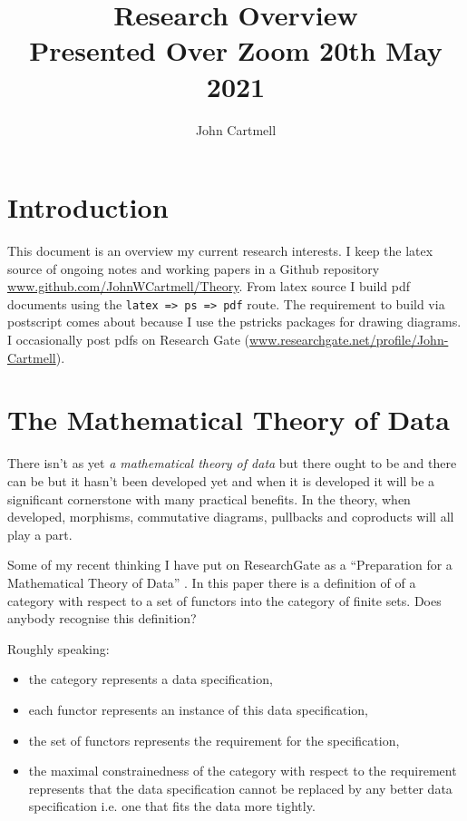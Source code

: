 \documentclass[10pt,a4paper]{article}
\theoremstyle{remark}
\begin{document}
\title{Research Overview \\
\small Presented Over Zoom 20th May 2021}

\date{}
\author{John Cartmell}

\maketitle


\section{Introduction}

\note This document is an overview my current research interests. I keep the latex source of ongoing notes and working papers in a 
Github repository \url{www.github.com/JohnWCartmell/Theory}. From latex source I  build pdf documents using the \verb!latex => ps => pdf! route. The requirement to build via postscript comes about because I use the pstricks packages for drawing diagrams. I occasionally post pdfs on Research Gate 
(\url{www.researchgate.net/profile/John-Cartmell}).

\section{The Mathematical Theory of Data}
\note 
There isn't as yet \textit{a mathematical theory of data} but there ought to be and there can be but it hasn't been developed yet and when it is developed it will be a significant cornerstone with many practical benefits. 
In the theory, when developed, morphisms, commutative diagrams, pullbacks and coproducts will all play a part.

Some of my recent thinking I have put on ResearchGate as a ``Preparation for a Mathematical Theory of Data''
\cite{CartmellPreparation}. In this paper there is a definition of  of a category with respect to a set of functors into the category of finite sets. Does anybody recognise this definition? 

Roughly speaking:
\begin{itemize}
\item the category represents a data specification,
\item each functor represents an instance of this data specification,
\item the set of functors represents the requirement for the specification,
\item the maximal constrainedness of the category with respect to the requirement represents that the data specification cannot be replaced by any better data specification i.e. one that fits the data more tightly.
\end{itemize}
\end{document}
